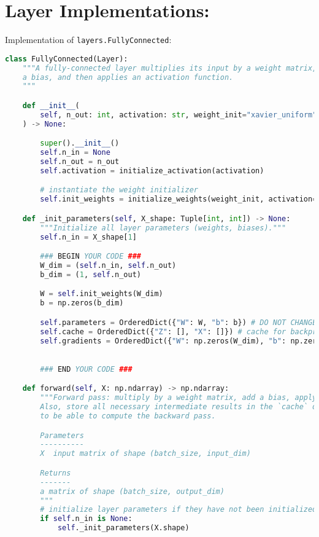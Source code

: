 \section{Layer Implementations:}

Implementation of \texttt{layers.FullyConnected}:

\begin{lstlisting}[language=Python]
class FullyConnected(Layer):
    """A fully-connected layer multiplies its input by a weight matrix, adds
    a bias, and then applies an activation function.
    """

    def __init__(
        self, n_out: int, activation: str, weight_init="xavier_uniform"
    ) -> None:

        super().__init__()
        self.n_in = None
        self.n_out = n_out
        self.activation = initialize_activation(activation)

        # instantiate the weight initializer
        self.init_weights = initialize_weights(weight_init, activation=activation)

    def _init_parameters(self, X_shape: Tuple[int, int]) -> None:
        """Initialize all layer parameters (weights, biases)."""
        self.n_in = X_shape[1]

        ### BEGIN YOUR CODE ###
        W_dim = (self.n_in, self.n_out)
        b_dim = (1, self.n_out)

        W = self.init_weights(W_dim)
        b = np.zeros(b_dim)

        self.parameters = OrderedDict({"W": W, "b": b}) # DO NOT CHANGE THE KEYS
        self.cache = OrderedDict({"Z": [], "X": []}) # cache for backprop
        self.gradients = OrderedDict({"W": np.zeros(W_dim), "b": np.zeros(b_dim)}) # parameter gradients initialized to zero
                                                                                   # MUST HAVE THE SAME KEYS AS `self.parameters`

        ### END YOUR CODE ###

    def forward(self, X: np.ndarray) -> np.ndarray:
        """Forward pass: multiply by a weight matrix, add a bias, apply activation.
        Also, store all necessary intermediate results in the `cache` dictionary
        to be able to compute the backward pass.

        Parameters
        ----------
        X  input matrix of shape (batch_size, input_dim)

        Returns
        -------
        a matrix of shape (batch_size, output_dim)
        """
        # initialize layer parameters if they have not been initialized
        if self.n_in is None:
            self._init_parameters(X.shape)


\end{lstlisting}
